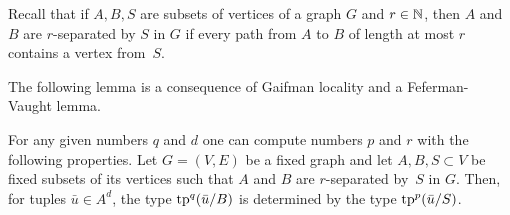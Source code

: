 Recall that if $A,B,S$ are subsets of vertices of a graph $G$ and $r\in\mathbb{N}$,
then $A$ and $B$ are $r$-separated by $S$ in $G$
if every path from $A$ to $B$ of length at most $r$ contains a vertex from~$S$.

\medskip
The following lemma is a consequence of Gaifman locality and a Feferman-Vaught lemma.

\begin{lemma}[$\star$]\label{lem:types}
For any given numbers $q$ and $d$
one can compute numbers $p$ and $r$ with the following properties.
Let $G=(V,E)$ be a fixed graph and let $A,B,S\subset V$ be fixed subsets of its vertices
such that $A$ and $B$ are $r$-separated by~$S$ in $G$.
Then, for tuples $\bar u\in A^{d}$, the type $\mathrm{tp}^q(\bar u/B)$ is determined by the type $\mathrm{tp}^{p}(\bar u/S)$.
\end{lemma}

